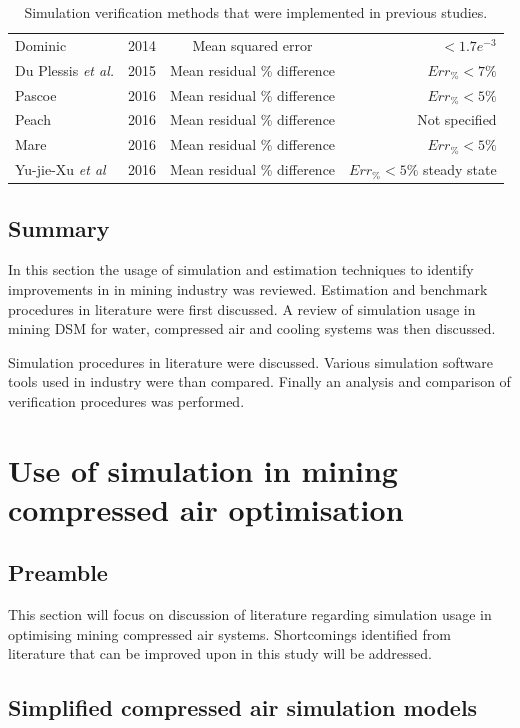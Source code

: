 \begin{table}[h]
\begin{tabular}{p{5cm}ccr}
 			Dominic \cite{dominic2014dynamic}					& 2014 & Mean squared error & $<1.7e^{-3}$	\\
 			Du Plessis \textit{et al.}\cite{du2015development} 	& 2015 &  Mean residual \% difference &  $Err_{\%} <7\%$  \\
 			Pascoe \cite{Pascoe2016Masters} 					& 2016 &  Mean residual \% difference &  $Err_{\%} <5\%$  \\	
			Peach \cite{Peach2016Masters}						& 2016 &  Mean residual \% difference & Not specified\\
 			Mare \cite{Mare2016PhD} 							& 2016 &  Mean residual \% difference &  $Err_{\%} <5\%$   \\	
 			Yu-jie-Xu \textit{et al} \cite{xu2016modeling}		& 2016 &  Mean residual \% difference &  $Err_{\%} <5\%$ steady state \\
 			\hline
 		\end{tabular} 
 		\caption{Simulation verification methods that were implemented in previous studies.}
 		\label{table: Verification studies}
 	\end{table}
 	\subsection{Summary}
 	In this section the usage of simulation and estimation techniques to identify improvements in in mining industry was reviewed. Estimation and benchmark procedures in literature were first discussed. A review of simulation usage in mining DSM for water, compressed air and cooling systems was then discussed. 
 	\par 
 	Simulation procedures in literature were discussed. Various simulation software tools used in industry were than compared. Finally an analysis and comparison of verification procedures was performed.
 	
\section{Use of simulation in mining compressed air optimisation}
\label{CompressorSimulation Literature}
\subsection{Preamble}
This section will focus on discussion of literature regarding simulation usage in optimising mining compressed air systems. Shortcomings identified from literature that can be improved upon in this study will be addressed.
\subsection{Simplified compressed air simulation models} \label{simplfiedModels}
